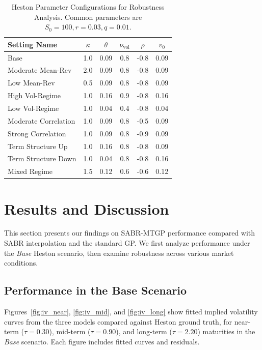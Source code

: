 \documentclass[preprint,12pt]{elsarticle}
\begin{document}
\begin{table}[htbp]
    \centering
    \caption{Heston Parameter Configurations for Robustness Analysis. Common parameters are $S_0=100, r=0.03, q=0.01$.}
    \label{tab:heston_params}
    \begin{tabular}{@{}lccccc@{}}
        \toprule
        Setting Name & $\kappa$ & $\theta$ & $\nu_{\text{vol}}$ & $\rho$ & $v_0$ \\
        \midrule
        Base                 & 1.0 & 0.09 & 0.8 & -0.8 & 0.09 \\
        Moderate Mean-Rev    & 2.0 & 0.09 & 0.8 & -0.8 & 0.09 \\
        Low Mean-Rev         & 0.5 & 0.09 & 0.8 & -0.8 & 0.09 \\
        High Vol-Regime      & 1.0 & 0.16 & 0.9 & -0.8 & 0.16 \\
        Low Vol-Regime       & 1.0 & 0.04 & 0.4 & -0.8 & 0.04 \\
        Moderate Correlation & 1.0 & 0.09 & 0.8 & -0.5 & 0.09 \\
        Strong Correlation   & 1.0 & 0.09 & 0.8 & -0.9 & 0.09 \\
        Term Structure Up    & 1.0 & 0.16 & 0.8 & -0.8 & 0.09 \\
        Term Structure Down  & 1.0 & 0.04 & 0.8 & -0.8 & 0.16 \\
        Mixed Regime         & 1.5 & 0.12 & 0.6 & -0.6 & 0.12 \\
        \bottomrule
    \end{tabular}
\end{table}

\section{Results and Discussion} \label{sec:results}

This section presents our findings on SABR-MTGP performance compared with SABR interpolation and the standard GP. We first analyze performance under the \textit{Base} Heston scenario, then examine robustness across various market conditions.

\subsection{Performance in the Base Scenario}

Figures~\ref{fig:iv_near}, \ref{fig:iv_mid}, and \ref{fig:iv_long} show fitted implied volatility curves from the three models compared against Heston ground truth, for near-term ($\tau=0.30$), mid-term ($\tau=0.90$), and long-term ($\tau=2.20$) maturities in the \textit{Base} scenario. Each figure includes fitted curves and residuals.
\end{document}
